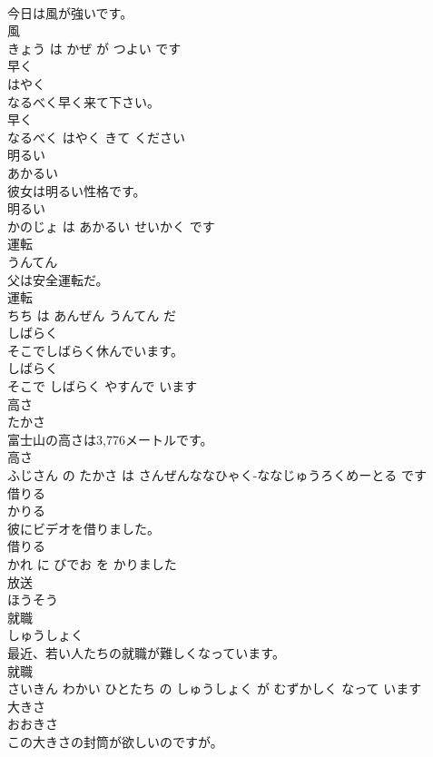\documentclass[8pt]{extreport}
\begin{document}
\begin{CJK}{UTF8}{min}
\\	今日は風が強いです。	
\\	風 
\\	きょう は かぜ が つよい です			
\\	早く	
\\	はやく			
\\	なるべく早く来て下さい。	
\\	早く 
\\	なるべく はやく きて ください			
\\	明るい	
\\	あかるい			
\\	彼女は明るい性格です。	
\\	明るい 
\\	かのじょ は あかるい せいかく です			
\\	運転	
\\	うんてん			
\\	父は安全運転だ。	
\\	運転 
\\	ちち は あんぜん うんてん だ			
\\	しばらく	
\\	そこでしばらく休んでいます。	
\\	しばらく 
\\	そこで しばらく やすんで います			
\\	高さ	
\\	たかさ			
\\	富士山の高さは3,776メートルです。	
\\	高さ 
\\	ふじさん の たかさ は さんぜんななひゃく-ななじゅうろくめーとる です			
\\	借りる	
\\	かりる			
\\	彼にビデオを借りました。	
\\	借りる 
\\	かれ に びでお を かりました			
\\	放送	
\\	ほうそう			
\\	就職	
\\	しゅうしょく			
\\	最近、若い人たちの就職が難しくなっています。	
\\	就職 
\\	さいきん わかい ひとたち の しゅうしょく が むずかしく なって います			
\\	大きさ	
\\	おおきさ			
\\	この大きさの封筒が欲しいのですが。	

\end{CJK}
\end{document}
